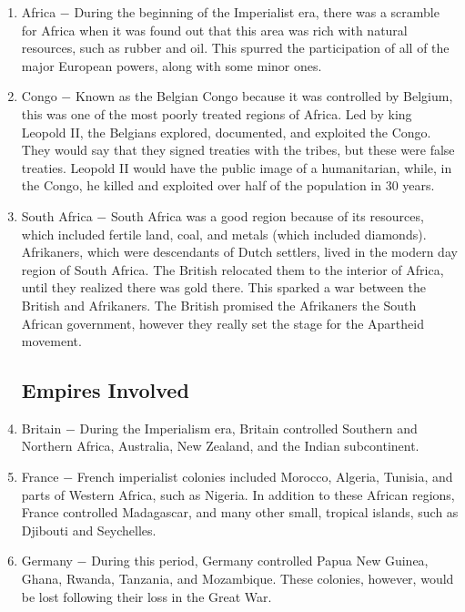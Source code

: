 \documentclass[12pt]{article}
\begin{document}
\begin{enumerate}
\item Africa $-$ During the beginning of the Imperialist era, there was a scramble for Africa when it was found out that this area was rich with natural resources, such as rubber and oil. This spurred the participation of all of the major European powers, along with some minor ones. 

\item Congo $-$ Known as the Belgian Congo because it was controlled by Belgium, this was one of the most poorly treated regions of Africa. Led by king Leopold II, the Belgians explored, documented, and exploited the Congo. They would say that they signed treaties with the tribes, but these were false treaties. Leopold II would have the public image of a humanitarian, while, in the Congo, he killed and exploited over half of the population in 30 years. 

\item South Africa $-$ South Africa was a good region because of its resources, which included fertile land, coal, and metals (which included diamonds). Afrikaners, which were descendants of Dutch settlers, lived in the modern day region of South Africa. The British relocated them to the interior of Africa, until they realized there was gold there. This sparked a war between the British and Afrikaners. The British promised the Afrikaners the South African government, however they really set the stage for the Apartheid movement.

\subsection{Empires Involved}

\item Britain $-$ During the Imperialism era, Britain controlled Southern and Northern Africa, Australia, New Zealand, and the Indian subcontinent.

\item France $-$ French imperialist colonies included Morocco, Algeria, Tunisia, and parts of Western Africa, such as Nigeria. In addition to these African regions, France controlled Madagascar, and many other small, tropical islands, such as Djibouti and Seychelles.

\item Germany $-$ During this period, Germany controlled Papua New Guinea, Ghana, Rwanda, Tanzania, and Mozambique. These colonies, however, would be lost following their loss in the Great War.


\end{enumerate}
\end{document}
